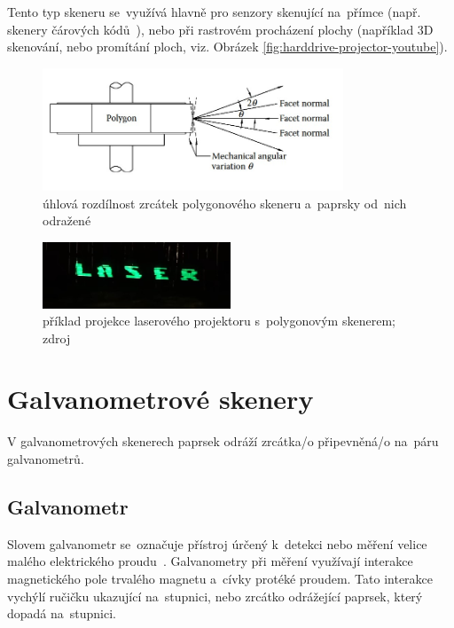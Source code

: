 Tento typ skeneru se~využívá hlavně pro senzory skenující na~přímce (např. skenery čárových kódů~\cite{history-of-barcode-scanning}), nebo při rastrovém procházení plochy (například 3D skenování, nebo promítání ploch, viz. Obrázek \ref{fig:harddrive-projector-youtube}).

\begin{figure}[!htb]
  \centering
  \includegraphics[width=0.8\textwidth]{img/polygon-angular-variation.jpg}
  \caption{\label{fig:polygon-angular-variation} úhlová rozdílnost zrcátek polygonového skeneru a~paprsky od~nich odražené}
\end{figure}


\begin{figure}[!htb]
  \centering
  \includegraphics[width=0.5\textwidth]{img/harddrive-projection.jpg}
  \caption{\label{fig:harddrive-projection} příklad projekce laserového projektoru s~polygonovým skenerem; zdroj~\cite{harddrive-projector-youtube}}
\end{figure}

\section{Galvanometrové skenery}
V galvanometrových skenerech paprsek odráží zrcátka/o připevněná/o na~páru galvanometrů.

\subsection{Galvanometr}
Slovem galvanometr se~označuje přístroj úrčený k~detekci nebo měření velice malého elektrického proudu~\cite{galvo-definition}. Galvanometry při měření využívají interakce magnetického pole trvalého magnetu a~cívky protéké proudem. Tato interakce vychýlí ručičku ukazující na~stupnici, nebo zrcátko odrážející paprsek, který dopadá na~stupnici.~\cite{wiki-galvo}

